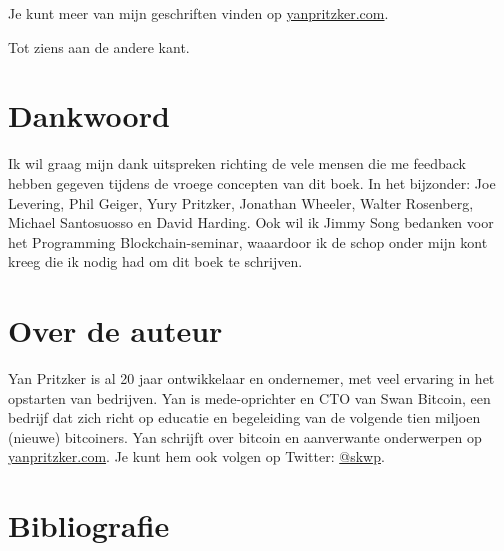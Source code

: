 \documentclass[
  letterpaper,
]{scrbook}
\newlength{\cslhangindent}
\newlength{\cslentryspacingunit} %
\newenvironment{CSLReferences}[2] %
 {%
  \setlength{\parindent}{0pt}
  \ifodd #1
  \let\oldpar\par
  \def\par{\hangindent=\cslhangindent\oldpar}
  \fi
  \setlength{\parskip}{#2\cslentryspacingunit}
 }%
 {}
\begin{document}
Je kunt meer van mijn geschriften vinden op
\href{https://yanpritzker.com}{yanpritzker.com}.

Tot ziens aan de andere kant.

\hypertarget{dankwoord}{%
\chapter*{Dankwoord}\label{dankwoord}}


Ik wil graag mijn dank uitspreken richting de vele mensen die me
feedback hebben gegeven tijdens de vroege concepten van dit boek. In het
bijzonder: Joe Levering, Phil Geiger, Yury Pritzker, Jonathan Wheeler,
Walter Rosenberg, Michael Santosuosso en David Harding. Ook wil ik Jimmy
Song bedanken voor het Programming Blockchain-seminar, waaardoor ik de
schop onder mijn kont kreeg die ik nodig had om dit boek te schrijven.

\hypertarget{over-de-auteur}{%
\chapter*{Over de auteur}\label{over-de-auteur}}


Yan Pritzker is al 20 jaar ontwikkelaar en ondernemer, met veel ervaring
in het opstarten van bedrijven. Yan is mede-oprichter en CTO van Swan
Bitcoin, een bedrijf dat zich richt op educatie en begeleiding van de
volgende tien miljoen (nieuwe) bitcoiners. Yan schrijft over bitcoin en
aanverwante onderwerpen op
\href{https://yanpritzker.com}{yanpritzker.com}. Je kunt hem ook volgen
op Twitter: \href{https://twitter.com/skwp}{@skwp}.

\hypertarget{bibliografie}{%
\chapter*{Bibliografie}\label{bibliografie}}


\hypertarget{refs}{}
\begin{CSLReferences}{0}{0}
\end{CSLReferences}


\backmatter
\end{document}
